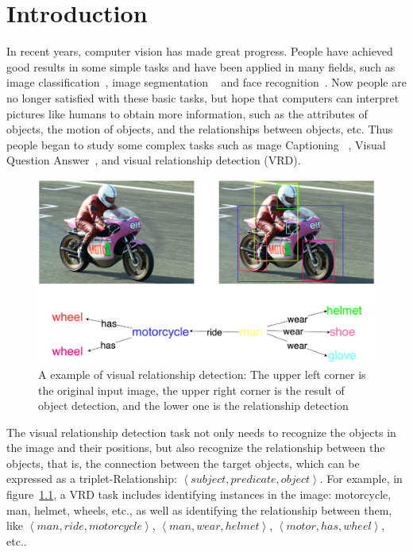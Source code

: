 \chapter{Introduction}
\label{chap:introduction}
\setcounter{page}{1}

In recent years, computer vision has made great progress. People have achieved good results in some simple tasks and have been applied in many fields, such as image classification~\cite{yu2017convolutional, lu2007survey}, image segmentation ~\cite{pham2000current} and face recognition~\cite{ahonen2006face, phillips1996feret}. Now people are no longer satisfied with these basic tasks, but hope that computers can interpret pictures like humans to obtain more information, such as the attributes of objects,  the motion of objects, and the relationships between objects, etc. Thus people began to study some complex tasks such as mage Captioning ~\cite{hossain2019comprehensive},  Visual Question Answer~\cite{antol2015vqa}, and  visual relationship detection (VRD). \\

\begin{figure}[!htbp]
	\centering
	\includegraphics[width = 0.9 \textwidth]{figures/senen_graph.png}
	\caption[A example of visual relationship detection]
	{ A example of visual relationship detection: The upper left corner is the original input image, the upper right corner is the result of object detection, and the lower one is the relationship detection}
	\label{fig:sene}
\end{figure}

The visual relationship detection task not only needs to recognize the objects in the image and their positions, but also recognize the relationship between the objects, that is, the connection between the target objects, which can be expressed as a triplet-Relationship: $\left \langle subject, predicate, object\right \rangle$. For example, in figure~\ref{fig:sene}, a VRD task includes identifying instances in the image: motorcycle, man, helmet, wheels, etc., as well as identifying the relationship between them, like $\left \langle man, ride, motorcycle\right \rangle$, $\left \langle man, wear, helmet\right \rangle$, $\left \langle motor, has, wheel\right \rangle$, etc..




